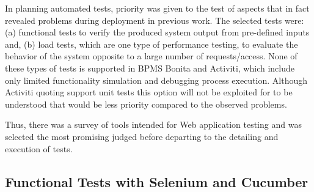 \documentclass[runningheads,a4paper]{llncs}
\begin{document}
In planning automated tests, priority was given to the test of aspects that in fact revealed problems during deployment in previous work. The selected tests were: (a) functional tests to verify the produced system output from pre-defined inputs and, (b) load tests, which are one type of performance testing, to evaluate the behavior of the system  opposite to a large number of requests/access. None of these types of tests is supported in BPMS Bonita and Activiti, which include only limited functionality simulation and debugging process execution. Although Activiti quoting support unit tests  this option will not be exploited for to be understood that would be less priority compared to the observed problems.

Thus, there was a survey of tools intended for Web application testing and was selected the most promising judged before departing to the detailing and execution of tests.%

\subsection{Functional Tests with Selenium and Cucumber}

\end{document}
